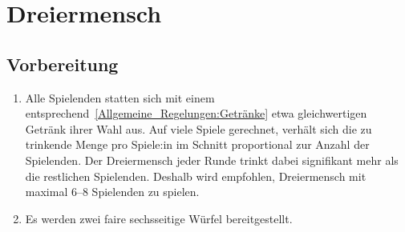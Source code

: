 \chapter{Dreiermensch}

\section{Vorbereitung}
\begin{enumerate}[label={(\arabic*)}]	
	\item
	Alle Spielenden statten sich mit einem entsprechend~\ref{Allgemeine_Regelungen:Getränke} etwa gleichwertigen Getränk ihrer Wahl aus.
	Auf viele Spiele gerechnet, verhält sich die zu trinkende Menge pro Spiele:in im Schnitt proportional zur Anzahl der Spielenden.
	Der Dreiermensch jeder Runde trinkt dabei signifikant mehr als die restlichen Spielenden.
	Deshalb wird empfohlen, Dreiermensch mit maximal 6--8 Spielenden zu spielen.
	
	\item
	Es werden zwei faire sechsseitige Würfel bereitgestellt.
\end{enumerate}

